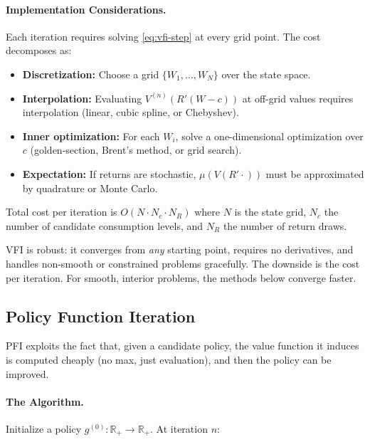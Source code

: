 \paragraph{Implementation Considerations.}
Each iteration requires solving \cref{eq:vfi-step} at every grid point. The cost decomposes as:
\begin{itemize}[leftmargin=2em]
    \item \textbf{Discretization:} Choose a grid $\{W_1, \ldots, W_N\}$ over the state space.
    \item \textbf{Interpolation:} Evaluating $V^{(n)}(R'(W-c))$ at off-grid values requires interpolation (linear, cubic spline, or Chebyshev).
    \item \textbf{Inner optimization:} For each $W_i$, solve a one-dimensional optimization over $c$ (golden-section, Brent's method, or grid search).
    \item \textbf{Expectation:} If returns are stochastic, $\mu(V(R'\cdot))$ must be approximated by quadrature or Monte Carlo.
\end{itemize}
Total cost per iteration is $O(N \cdot N_c \cdot N_R)$ where $N$ is the state grid, $N_c$ the number of candidate consumption levels, and $N_R$ the number of return draws.

\begin{calloutnote}
VFI is robust: it converges from \emph{any} starting point, requires no derivatives, and handles non-smooth or constrained problems gracefully. The downside is the cost per iteration. For smooth, interior problems, the methods below converge faster.
\end{calloutnote}

\subsection{Policy Function Iteration}
\label{subsec:dp-pfi}

PFI exploits the fact that, given a candidate policy, the value function it induces is computed cheaply (no max, just evaluation), and then the policy can be improved.

\paragraph{The Algorithm.}
Initialize a policy $g^{(0)}: \mathbb{R}_+ \to \mathbb{R}_+$. At iteration $n$:

